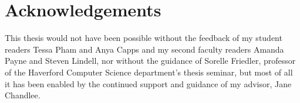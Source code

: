 %
\chapter*{Acknowledgements}
\label{sec:acknowledgement}
\vspace*{-10mm}

This thesis would not have been possible without the feedback of my student readers Tessa Pham and Anya Capps and my second faculty readers Amanda Payne and Steven Lindell, nor without the guidance of Sorelle Friedler, professor of the Haverford Computer Science department's thesis seminar, but most of all it has been enabled by the continued support and guidance of my advisor, Jane Chandlee.